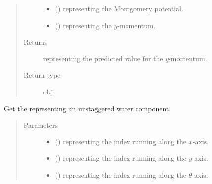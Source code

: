 \documentclass[letterpaper,10pt,english]{sphinxmanual}
\begin{document}
\begin{fulllineitems}
\begin{fulllineitems}
\begin{quote}
\begin{description}
\begin{itemize}
\item {} 
 () \textendash{}  representing the Montgomery potential.

\item {} 
 () \textendash{}  representing the \(y\)-momentum.

\end{itemize}

\item[{Returns}] \leavevmode
{} representing the predicted value for the \(y\)-momentum.

\item[{Return type}] \leavevmode
obj

\end{description}\end{quote}

\end{fulllineitems}


\begin{fulllineitems}
\label{\detokenize{api:dycore.flux_isentropic.FluxIsentropicMacCormack._get_velocity}}
Get the  representing an unstaggered water component.
\begin{quote}\begin{description}
\item[{Parameters}] \leavevmode\begin{itemize}
\item {} 
 () \textendash{}  representing the index running along the \(x\)-axis.

\item {} 
 () \textendash{}  representing the index running along the \(y\)-axis.

\item {} 
 () \textendash{}  representing the index running along the \(\theta\)-axis.


\end{itemize}
\end{description}
\end{quote}
\end{fulllineitems}
\end{fulllineitems}
\end{document}
